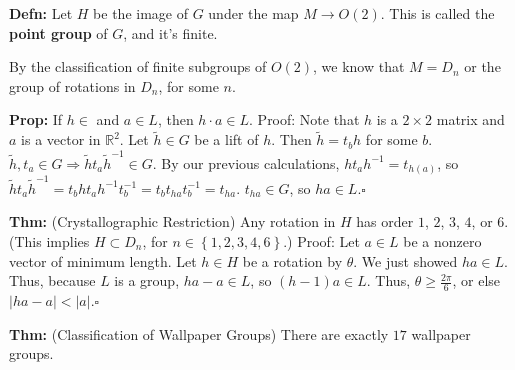 \documentclass[10pt,letterpaper]{article}
\newcommand{\n}{\hfill\break}
\newcommand{\hangblock}[2]{\par\noindent\settowidth{\hangindent}{\textbf{#1: }}\textbf{#1: }\!\!\!#2}
\newcommand{\defn}[1]{\hangblock{Defn}{#1}}
\newcommand{\thm}[1]{\hangblock{Thm}{#1}}
\newcommand{\prop}[1]{\hangblock{Prop}{#1}}
\newcommand{\proven}{\;$\square$\n}
\newcommand{\set}[1]{\left\{#1\right\}}
\newcommand{\reals}{\mathbb{R}}
\newcommand{\R}{\reals}
\newcommand{\inv}{^{-1}}
\newcommand{\abs}[1]{\left|#1\right|}
\begin{document}
\defn{
	Let $H$ be the image of $G$ under the map $M\to{}O(2)$. This is called the \textbf{point group} of $G$, and it's finite.\n
}

\par\noindent
By the classification of finite subgroups of $O(2)$, we know that $M=D_{n}$ or the group of rotations in $D_{n}$, for some $n$.\n

\prop{
	If $h\in{}$ and $a\in{}L$, then $h\cdot{}a\in{}L$.\n
	Proof: Note that $h$ is a $2\times{}2$ matrix and $a$ is a vector in $\R^{2}$. Let $\tilde{h}\in{}G$ be a lift of $h$. Then $\tilde{h}=t_{b}h$ for some $b$. $\tilde{h},t_{a}\in{}G\Rightarrow\tilde{h}t_{a}\tilde{h}\inv\in{}G$.\n
	By our previous calculations, $ht_{a}h\inv=t_{h(a)}$, so $\tilde{h}t_{a}\tilde{h}\inv=t_{b}ht_{a}h\inv{}t_{b}\inv=t_{b}t_{ha}t_{b}\inv=t_{ha}$.\n
	$t_{ha}\in{}G$, so $ha\in{}L$.\proven
}

\thm{
	(Crystallographic Restriction) Any rotation in $H$ has order $1$, $2$, $3$, $4$, or $6$.\n
	(This implies $H\subset{}D_{n}$, for $n\in\set{1,2,3,4,6}$.)\n
	Proof: Let $a\in{}L$ be a nonzero vector of minimum length. Let $h\in{}H$ be a rotation by $\theta$. We just showed $ha\in{}L$. Thus, because $L$ is a group, $ha-a\in{}L$, so $(h-1)a\in{}L$. Thus, $\theta\ge\frac{2\pi}{6}$, or else $\abs{ha-a}<\abs{a}$.\proven
}

\thm{
	(Classification of Wallpaper Groups) There are exactly $17$ wallpaper groups.\n
}
\end{document}
